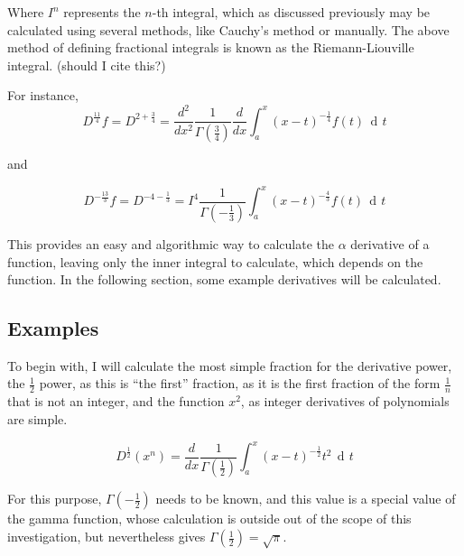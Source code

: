 \documentclass{article}
\DeclareMathOperator{\di}{\,d\!}
\begin{document}
Where $I^n$ represents the $n$-th integral, which as discussed previously may
be calculated using several methods, like Cauchy's method or manually. The
above method of defining fractional integrals is known as the Riemann-Liouville
integral. (should I cite this?)

For instance,
$$
D^{\frac{11}{4}} f = D^{2+\frac{3}{4}}
				 = \frac{d^2}{dx^2}\frac{1}{\Gamma\left(\frac{3}{4}\right)}
				 \frac{d}{dx} \int_a^x\left(x-t\right)^{-\frac{1}{4}} f(t) \di t
$$

and

$$
D^{-\frac{13}{3}} f = D^{-4-\frac{1}{3}}
					= I^4 \frac{1}{\Gamma\left(-\frac{1}{3}\right)} \int_a^x \left(x-t\right)^{-\frac{4}{3}} f(t) \di t
$$

This provides an easy and algorithmic way to calculate the $\alpha$ derivative
of a function, leaving only the inner integral to calculate, which depends on
the function. In the following section, some example derivatives will be
calculated.

\subsection{Examples}

To begin with, I will calculate the most simple fraction for the derivative
power, the $\frac{1}{2}$ power, as this is ``the first'' fraction, as it is the
first fraction of the form $\frac{1}{n}$ that is not an integer, and the
function $x^2$, as integer derivatives of polynomials are simple.

$$
D^{\frac{1}{2}} \left(x^n\right) = \frac{d}{dx} \frac{1}{\Gamma\left(\frac{1}{2}\right)} \int_a^x \left(x-t\right)^{-\frac{1}{2}} t^2 \di t
$$

For this purpose, $\Gamma\left(-\frac{1}{2}\right)$ needs to be known, and this
value is a special value of the gamma function, whose calculation is outside
out of the scope of this investigation, but nevertheless gives
$\Gamma\left(\frac{1}{2}\right) = \sqrt{\pi}$.
\end{document}
